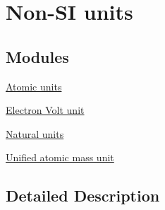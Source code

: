 \hypertarget{group___n_i_s_t_const-_non-_s_i}{}\section{Non-\/\+SI units}
\label{group___n_i_s_t_const-_non-_s_i}
\subsection*{Modules}
\begin{DoxyCompactItemize}
\item 
\hyperlink{group___n_i_s_t_const-_atomic_unit}{Atomic units}
\item 
\hyperlink{group___n_i_s_t_const-_electron_volt_unit}{Electron Volt unit}
\item 
\hyperlink{group___n_i_s_t_const-_natural_unit}{Natural units}
\item 
\hyperlink{group___n_i_s_t_const-_unified_atomic_mass_unit}{Unified atomic mass unit}
\end{DoxyCompactItemize}


\subsection{Detailed Description}
